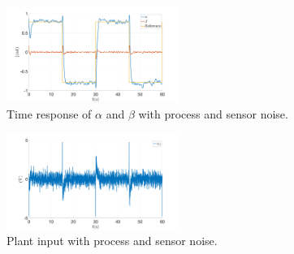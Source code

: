 \documentclass[letterpaper, 10 pt, conference]{ieeeconf}
\begin{document}
\begin{figure}[h]
    \centering
    \includegraphics[width = 0.5\textwidth]{figures/11_1_angles.png}
    \caption{Time response of $\alpha$ and $\beta$ with process and sensor noise.}
    \label{fig:11_1_angles}
\end{figure}
\begin{figure}[h]
    \centering
    \includegraphics[width = 0.5\textwidth]{figures/11_1_u.png}
    \caption{Plant input with process and sensor noise.}
    \label{fig:11_1_u}
\end{figure}
\end{document}
